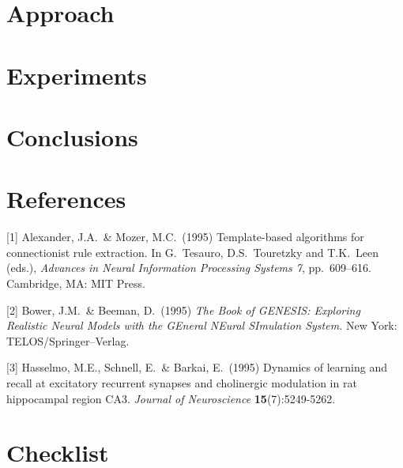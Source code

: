 \documentclass{article}
\begin{document}
\section{Approach}



\section{Experiments}



\section{Conclusions}



\section*{References}
\medskip


{
\small


[1] Alexander, J.A.\ \& Mozer, M.C.\ (1995) Template-based algorithms for
connectionist rule extraction. In G.\ Tesauro, D.S.\ Touretzky and T.K.\ Leen
(eds.), {\it Advances in Neural Information Processing Systems 7},
pp.\ 609--616. Cambridge, MA: MIT Press.


[2] Bower, J.M.\ \& Beeman, D.\ (1995) {\it The Book of GENESIS: Exploring
  Realistic Neural Models with the GEneral NEural SImulation System.}  New York:
TELOS/Springer--Verlag.


[3] Hasselmo, M.E., Schnell, E.\ \& Barkai, E.\ (1995) Dynamics of learning and
recall at excitatory recurrent synapses and cholinergic modulation in rat
hippocampal region CA3. {\it Journal of Neuroscience} {\bf 15}(7):5249-5262.
}


\section*{Checklist}
\end{document}
